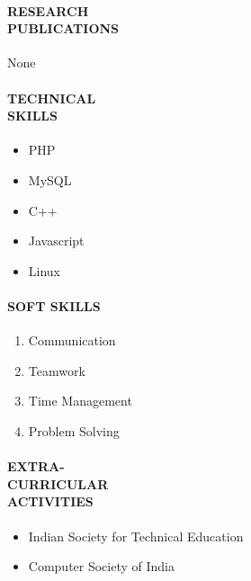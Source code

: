 \documentclass{article}
\begin{document}
\paragraph{\textbf{RESEARCH \\PUBLICATIONS }}

None
\paragraph{\textbf{TECHNICAL\\SKILLS }}

\begin{itemize}
	\item PHP
	\item MySQL
	\item C++
	\item Javascript
	\item Linux
\end{itemize}
\paragraph{\textbf{SOFT SKILLS }}

\begin{enumerate}
	\item Communication
	\item Teamwork
	\item Time Management
	\item Problem Solving
\end{enumerate}
\paragraph{\textbf{EXTRA-\\CURRICULAR\\ACTIVITIES }}

\begin{itemize}
	\item Indian Society for Technical Education
	\item Computer Society of India
\end{itemize}
\end{document}
